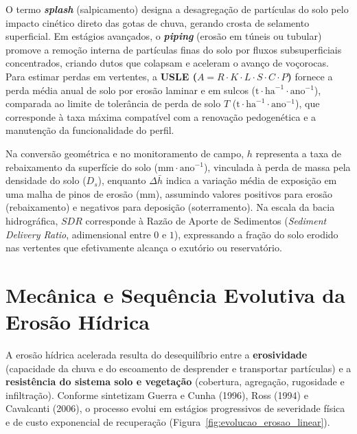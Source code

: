 
\begin{boxSimbolo}
O termo \textbf{\textit{splash}} (salpicamento) designa a desagregação de partículas do solo pelo impacto cinético direto das gotas de chuva, gerando crosta de selamento superficial. Em estágios avançados, o \textbf{\textit{piping}} (erosão em túneis ou tubular) promove a remoção interna de partículas finas do solo por fluxos subsuperficiais concentrados, criando dutos que colapsam e aceleram o avanço de voçorocas. Para estimar perdas em vertentes, a \textbf{USLE ($A = R \cdot K \cdot L \cdot S \cdot C \cdot P$)} fornece a perda média anual de solo por erosão laminar e em sulcos ($\text{t}\cdot\text{ha}^{-1}\cdot\text{ano}^{-1}$), comparada ao limite de tolerância de perda de solo $T$ ($\text{t}\cdot\text{ha}^{-1}\cdot\text{ano}^{-1}$), que corresponde à taxa máxima compatível com a renovação pedogenética e a manutenção da funcionalidade do perfil.

Na conversão geométrica e no monitoramento de campo, $h$ representa a taxa de rebaixamento da superfície do solo ($\text{mm}\cdot\text{ano}^{-1}$), vinculada à perda de massa pela densidade do solo ($D_s$), enquanto $\Delta \bar{h}$ indica a variação média de exposição em uma malha de pinos de erosão ($\text{mm}$), assumindo valores positivos para erosão (rebaixamento) e negativos para deposição (soterramento). Na escala da bacia hidrográfica, $SDR$ corresponde à Razão de Aporte de Sedimentos (\textit{Sediment Delivery Ratio}, adimensional entre $0$ e $1$), expressando a fração do solo erodido nas vertentes que efetivamente alcança o exutório ou reservatório.
\end{boxSimbolo}

\section{Mecânica e Sequência Evolutiva da Erosão Hídrica}

A erosão hídrica acelerada resulta do desequilíbrio entre a \textbf{erosividade} (capacidade da chuva e do escoamento de desprender e transportar partículas) e a \textbf{resistência do sistema solo e vegetação} (cobertura, agregação, rugosidade e infiltração). Conforme sintetizam Guerra e Cunha (1996), Ross (1994) e Cavalcanti (2006), o processo evolui em estágios progressivos de severidade física e de custo exponencial de recuperação (Figura~\ref{fig:evolucao_erosao_linear}).

